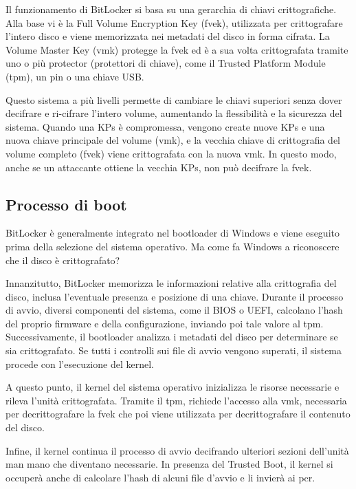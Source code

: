 Il funzionamento di BitLocker si basa su una gerarchia di chiavi crittografiche. Alla base vi è la Full Volume Encryption Key (\acrshort{fvek}), utilizzata per crittografare l'intero disco e viene memorizzata nei metadati del disco in forma cifrata. La Volume Master Key (\acrshort{vmk}) protegge la \acrshort{fvek} ed è a sua volta crittografata tramite uno o più protector (protettori di chiave), come il Trusted Platform Module (\acrshort{tpm}), un \acrshort{pin} o una chiave USB.

Questo sistema a più livelli permette di cambiare le chiavi superiori senza dover decifrare e ri-cifrare l'intero volume, aumentando la flessibilità e la sicurezza del sistema. Quando una KPs è compromessa, vengono create nuove KPs e una nuova chiave principale del volume (\acrshort{vmk}), e la vecchia chiave di crittografia del volume completo (\acrshort{fvek}) viene crittografata con la nuova \acrshort{vmk}. In questo modo, anche se un attaccante ottiene la vecchia KPs, non può decifrare la \acrshort{fvek}.

\subsection{Processo di boot}\label{subsec:processo_de_boot}

BitLocker è generalmente integrato nel bootloader di Windows e viene eseguito prima della selezione del sistema operativo. Ma come fa Windows a riconoscere che il disco è crittografato?

Innanzitutto, BitLocker memorizza le informazioni relative alla crittografia del disco, inclusa l'eventuale presenza e posizione di una chiave. Durante il processo di avvio, diversi componenti del sistema, come il BIOS o UEFI, calcolano l'hash del proprio firmware e della configurazione, inviando poi tale valore al \acrshort{tpm}. Successivamente, il bootloader analizza i metadati del disco per determinare se sia crittografato. Se tutti i controlli sui file di avvio vengono superati, il sistema procede con l’esecuzione del kernel.

A questo punto, il kernel del sistema operativo inizializza le risorse necessarie e rileva l’unità crittografata. Tramite il \acrshort{tpm}, richiede l’accesso alla \acrshort{vmk}, necessaria per decrittografare la \acrshort{fvek} che poi viene utilizzata per decrittografare il contenuto del disco.

Infine, il kernel continua il processo di avvio decifrando ulteriori sezioni dell’unità man mano che diventano necessarie. In presenza del Trusted Boot, il kernel si occuperà anche di calcolare l’hash di alcuni file d’avvio e li invierà ai \acrshort{pcr}.


